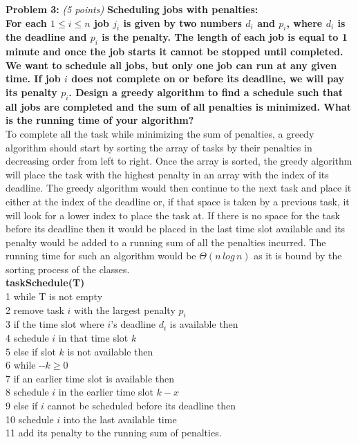 \documentclass{article}
\begin{document}
\noindent \textbf{Problem 3:} \textit{(5 points)} \textbf{Scheduling jobs with penalties:}\\

\noindent \textbf{For each $1 \leq i \leq n$ job $j_i$ is given by two numbers $d_i$ and $p_i$, where $d_i$ is the deadline and $p_i$ is the penalty. The length of each job is equal to 1 minute and once the job starts it cannot be stopped until completed. We want to schedule all jobs, but only one job can run at any given time. If job $i$ does not complete on or before its deadline, we will pay its penalty $p_i$. Design a greedy algorithm to find a schedule such that all jobs are completed and the sum of all penalties is minimized. What is the running time of your algorithm?}
\\[.25cm]

To complete all the task while minimizing the sum of penalties, a greedy algorithm should start by sorting the array of tasks by their penalties in decreasing order from left to right. Once the array is sorted, the greedy algorithm will place the task with the highest penalty in an array with the index of its deadline. The greedy algorithm would then continue to the next task and place it either at the index of the deadline or, if that space is taken by a previous task, it will look for a lower index to place the task at. If there is no space for the task before its deadline then it would be placed in the last time slot available and its penalty would be added to a running sum of all the penalties incurred. The running time for such an algorithm would be $\Theta(n\,log\,n)$ as it is bound by the sorting process of the classes.\\[.15cm]

\noindent \textbf{taskSchedule(T)}\\
1 \quad while T is not empty\\
2 \qquad remove task $i$ with the largest penalty $p_i$\\
3 \qquad if the time slot where $i$'s deadline $d_i$ is available then\\
4 \qquad\qquad schedule $i$ in that time slot $k$ \\
5 \qquad else if slot $k$ is not available then\\
6 \qquad\qquad while -{}-$k \geq 0$\\
7 \qquad\qquad\qquad if an earlier time slot is available then\\
8 \qquad\qquad\qquad\qquad schedule $i$ in the earlier time slot $k-x$\\
9 \qquad else if $i$ cannot be scheduled before its deadline then\\
10 \qquad\qquad schedule $i$ into the last available time \\
11 \qquad\qquad add its penalty to the running sum of penalties.\\[.25cm]
\end{document}

